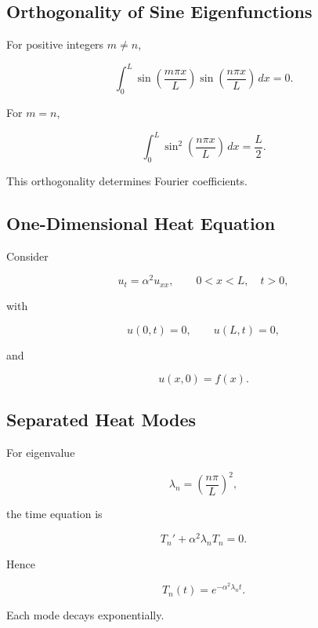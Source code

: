 \subsection{Orthogonality of Sine Eigenfunctions}
\label{subsec:sine-eigenfunction-orthogonality}

For positive integers \(m\neq n\),

\[
\boxed{
\int_0^L
\sin
\left(
\frac{m\pi x}{L}
\right)
\sin
\left(
\frac{n\pi x}{L}
\right)
\,dx
=
0.
}
\]

For \(m=n\),

\[
\boxed{
\int_0^L
\sin^2
\left(
\frac{n\pi x}{L}
\right)
\,dx
=
\frac{L}{2}.
}
\]

This orthogonality determines Fourier coefficients.

\subsection{One-Dimensional Heat Equation}
\label{subsec:one-dimensional-heat-equation}

Consider

\[
\boxed{
u_t
=
\alpha^2u_{xx},
\qquad
0<x<L,
\quad
t>0,
}
\]

with

\[
\boxed{
u(0,t)=0,
\qquad
u(L,t)=0,
}
\]

and

\[
\boxed{
u(x,0)=f(x).
}
\]

\subsection{Separated Heat Modes}
\label{subsec:heat-separated-modes}

For eigenvalue

\[
\lambda_n
=
\left(
\frac{n\pi}{L}
\right)^2,
\]

the time equation is

\[
\boxed{
T_n'
+
\alpha^2\lambda_nT_n
=
0.
}
\]

Hence

\[
\boxed{
T_n(t)
=
e^{-\alpha^2\lambda_nt}.
}
\]

Each mode decays exponentially.

